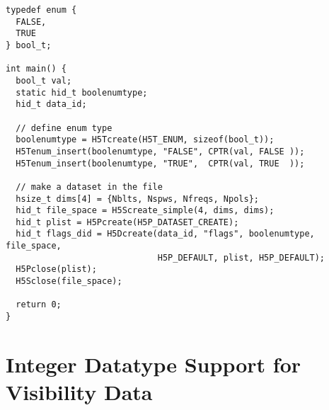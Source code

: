 \documentclass[11pt, oneside]{article}
\begin{document}
\begin{appendices}
\begin{verbatim}
typedef enum {
  FALSE,
  TRUE
} bool_t;

int main() {
  bool_t val;
  static hid_t boolenumtype;
  hid_t data_id;

  // define enum type
  boolenumtype = H5Tcreate(H5T_ENUM, sizeof(bool_t));
  H5Tenum_insert(boolenumtype, "FALSE", CPTR(val, FALSE ));
  H5Tenum_insert(boolenumtype, "TRUE",  CPTR(val, TRUE  ));

  // make a dataset in the file
  hsize_t dims[4] = {Nblts, Nspws, Nfreqs, Npols};
  hid_t file_space = H5Screate_simple(4, dims, dims);
  hid_t plist = H5Pcreate(H5P_DATASET_CREATE);
  hid_t flags_did = H5Dcreate(data_id, "flags", boolenumtype, file_space,
                              H5P_DEFAULT, plist, H5P_DEFAULT);
  H5Pclose(plist);
  H5Sclose(file_space);

  return 0;
}
\end{verbatim}



\section{Integer Datatype Support for Visibility Data}
\label{appendix:integers}

\end{appendices}
\end{document}
